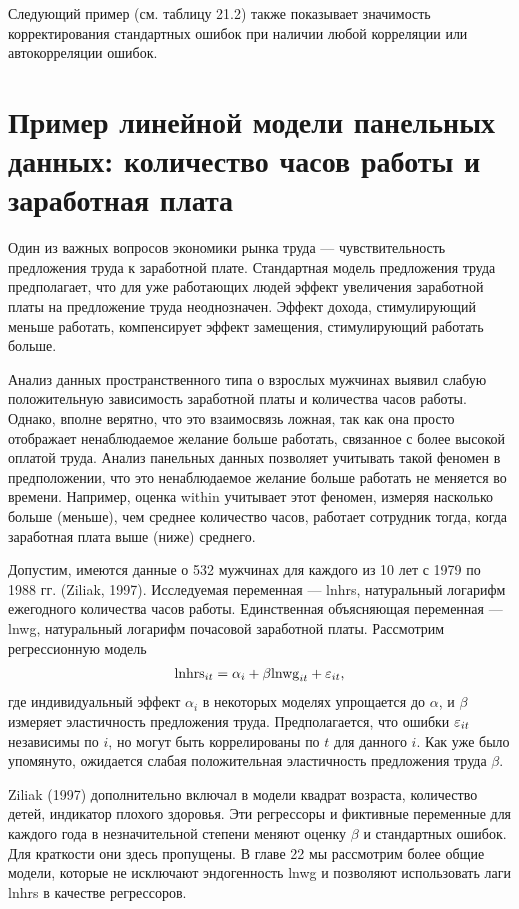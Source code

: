 Следующий пример (см. таблицу 21.2) также показывает значимость корректирования стандартных ошибок при наличии любой корреляции или автокорреляции ошибок.

\section{Пример линейной модели панельных данных: количество часов работы и заработная плата}

Один из важных вопросов экономики рынка труда  --- чувствительность предложения труда к заработной плате. Стандартная модель предложения труда предполагает, что для уже работающих людей эффект увеличения заработной платы на предложение труда неоднозначен. Эффект дохода, стимулирующий меньше работать, компенсирует эффект замещения, стимулирующий работать больше.

Анализ данных пространственного типа о взрослых мужчинах выявил слабую положительную зависимость заработной платы и количества часов работы. Однако, вполне верятно, что это взаимосвязь ложная, так как она просто отображает ненаблюдаемое желание больше работать, связанное с более высокой оплатой труда. Анализ панельных данных позволяет учитывать такой феномен в предположении, что это ненаблюдаемое желание больше работать не меняется во времени. Например, оценка within учитывает этот феномен, измеряя насколько больше (меньше), чем среднее количество часов, работает сотрудник тогда, когда заработная плата выше (ниже) среднего.

Допустим, имеются данные о 532 мужчинах для каждого из 10 лет с 1979 по 1988 гг. (Ziliak, 1997). Исследуемая переменная --- lnhrs, натуральный логарифм ежегодного количества часов работы. Единственная объясняющая переменная --- lnwg, натуральный логарифм почасовой заработной платы. Рассмотрим регрессионную модель
\begin{align}
\mathrm {lnhrs}_{it}=\alpha_i +\beta \mathrm {lnwg}_{it}+\varepsilon_{it},
\nonumber
\end{align}
где индивидуальный эффект $\alpha_i$ в некоторых моделях упрощается до $\alpha$, и $\beta$ измеряет эластичность предложения труда. Предполагается, что ошибки $\varepsilon_{it}$ независимы по $i$, но могут быть коррелированы по $t$ для данного $i$. Как уже было упомянуто, ожидается слабая положительная эластичность предложения труда $\beta$.

Ziliak (1997) дополнительно включал в модели квадрат возраста, количество детей, индикатор плохого здоровья. Эти регрессоры и фиктивные переменные для каждого года в незначительной степени меняют оценку $\beta$ и стандартных ошибок. Для краткости они здесь пропущены. В главе 22 мы рассмотрим более общие модели, которые не исключают эндогенность lnwg и позволяют использовать лаги lnhrs в качестве регрессоров.

